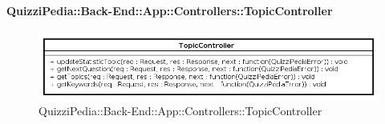\paragraph{QuizziPedia::Back-End::App::Controllers::TopicController}
\label{QuizziPedia::Back-End::App::Controllers::TopicController}
\begin{figure}[ht]
	\centering
	\includegraphics[scale=0.8]{UML/Classi/Back-End/QuizziPedia_Back-End_App_Controllers_topicController.png}
	\caption{QuizziPedia::Back-End::App::Controllers::TopicController}
\end{figure}
\FloatBarrier
